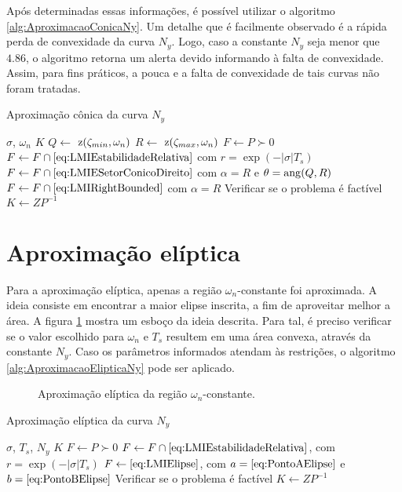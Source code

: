 Após determinadas essas informações, é possível utilizar o algoritmo \ref{alg:AproximacaoConicaNy}. Um detalhe que é facilmente observado é a rápida perda de convexidade da curva $N_y$. Logo, caso a constante $N_y$ seja menor que $4.86$\cite{CHIQUETO2021}, o algoritmo retorna um alerta devido informando à falta de convexidade. Assim, para fins práticos, a pouca e a falta de convexidade de tais curvas não foram tratadas.
\begin{algorithm}[hb!]
  \caption{Aproximação cônica da curva $N_y$}\label{alg:AproximacaoConicaNy}
  \begin{algorithmic}[1]
    \Require $\sigma$, $\omega_n$
    \Ensure $K$
    \State $Q \gets $ $\operatorname{\mathrm{z}}(\zeta_{min},\omega_n)$
    \State $R \gets $ $\operatorname{\mathrm{z}}(\zeta_{max},\omega_n)$
    \State $F \gets P \succ 0$
    \State $F \gets F \cap \eqref{eq:LMIEstabilidadeRelativa}$ com $r = \exp{\left(-|\sigma|T_s\right)}$ 
    \State $F \gets F \cap \eqref{eq:LMIESetorConicoDireito}$ com $\alpha = R$ e $\theta = \operatorname{ang}(Q,R)$ 
    \State $F \gets F \cap \eqref{eq:LMIRightBounded}$ com $\alpha = R$ 
    \State Verificar se o problema é factível
    \State $K \gets ZP^{-1}$
  \end{algorithmic}
\end{algorithm}

\section{Aproximação elíptica}
Para a aproximação elíptica, apenas a região $\omega_n$-constante foi aproximada. A ideia consiste em encontrar a maior elipse inscrita, a fim de aproveitar melhor a área. A figura \ref{fig:AproximacaoEliptica} mostra um esboço da ideia descrita. Para tal, é preciso verificar se o valor escolhido para $\omega_n$ e $T_s$ resultem em uma área convexa\cite{CHIQUETO2021}, através da constante $N_y$. Caso os parâmetros informados atendam às restrições, o algoritmo \ref{alg:AproximacaoElipticaNy} pode ser aplicado.
\begin{figure}[!ht]
  \centering
  
  \caption{Aproximação elíptica da região $\omega_n$-constante.}
  \label{fig:AproximacaoEliptica}
\end{figure}

\begin{algorithm}[hb!]
  \caption{Aproximação elíptica da curva $N_y$}\label{alg:AproximacaoElipticaNy}
  \begin{algorithmic}[1]
    \Require $\sigma$, $T_s$, $N_y$
    \Ensure $K$
    \State $F \gets P \succ 0$
    \State $F \gets F \cap \eqref{eq:LMIEstabilidadeRelativa}$, com $r = \exp{\left(-|\sigma|T_s\right)}$ 
    \State $F \gets \eqref{eq:LMIElipse}$, com $a = \eqref{eq:PontoAElipse}$ e $b = \eqref{eq:PontoBElipse}$ 
    \State Verificar se o problema é factível
    \State $K \gets ZP^{-1}$
  \end{algorithmic}
\end{algorithm}

